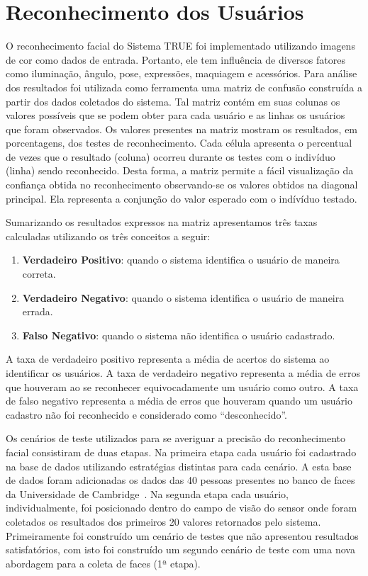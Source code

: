 \section{Reconhecimento dos Usuários}
	 
	O reconhecimento facial do Sistema TRUE foi implementado utilizando imagens de cor como dados de entrada. Portanto, ele tem influência de diversos fatores como iluminação, ângulo, pose, expressões, maquiagem e acessórios. Para análise dos resultados foi utilizada como ferramenta uma matriz de confusão construída a partir dos dados coletados do sistema. Tal matriz contém em suas colunas os valores possíveis que se podem obter para cada usuário e as linhas os usuários que foram observados. Os valores presentes na matriz mostram os resultados, em porcentagens, dos testes de reconhecimento. Cada célula apresenta o percentual de vezes que o resultado (coluna) ocorreu durante os testes com o indivíduo (linha) sendo reconhecido. Desta forma, a matriz permite a fácil visualização da confiança obtida no reconhecimento observando-se os valores obtidos na diagonal principal. Ela representa a conjunção do valor esperado com o indívíduo testado.

	Sumarizando os resultados expressos na matriz apresentamos três taxas calculadas utilizando os três conceitos a seguir:

	\begin{enumerate}
		\item \textbf{Verdadeiro Positivo}: quando o sistema identifica o usuário de maneira correta.
		\item \textbf{Verdadeiro Negativo}: quando o sistema identifica o usuário de maneira errada.
		\item \textbf{Falso Negativo}: quando o sistema não identifica o usuário cadastrado.
	\end{enumerate}

	A taxa de verdadeiro positivo representa a média de acertos do sistema ao identificar os usuários. A taxa de verdadeiro negativo representa a média de erros que houveram ao se reconhecer equivocadamente um usuário como outro. A taxa de falso negativo representa a média de erros que houveram quando um usuário cadastro não foi reconhecido e considerado como ``desconhecido''.


Os cenários de teste utilizados para se averiguar a precisão do reconhecimento
facial consistiram de duas etapas. 
Na primeira etapa cada usuário foi cadastrado
na base de dados utilizando estratégias distintas para cada cenário. A esta
base de dados foram adicionadas os dados das 40 pessoas presentes no banco de faces da Universidade de Cambridge~\cite{cambridgeFaceDb}. Na segunda etapa cada usuário,
individualmente, foi posicionado dentro do campo de visão do sensor onde foram
coletados os resultados dos primeiros 20 valores retornados pelo sistema.
Primeiramente foi construído um cenário de testes que não apresentou resultados
satisfatórios, com isto foi construído um segundo cenário de teste com uma nova
abordagem para a coleta de faces (1ª etapa).

